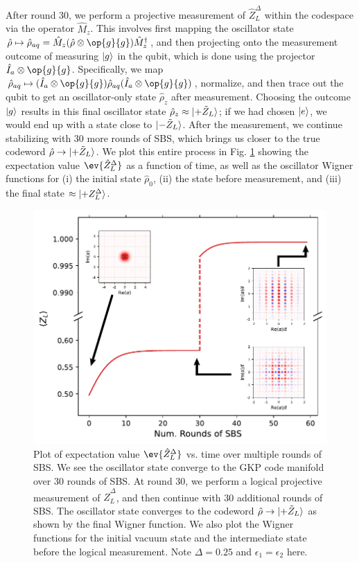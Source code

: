 After round 30, we perform a projective measurement of $\hat{Z}_L^\Delta$ within the codespace via the operator $\hat{M}_z$. This involves first mapping the oscillator state $\hat{\rho} \mapsto \hat{\rho}_{aq} = \hat{M}_z(\hat{\rho}\otimes \op{g}{g})\hat{M}_z^\dagger$, and then projecting onto the measurement outcome of measuring $\lvert g\rangle$ in the qubit, which is done using the projector $\hat{I}_a \otimes \op{g}{g}$. Specifically, we map $\hat{\rho}_{aq} \mapsto (\hat{I}_a \otimes \op{g}{g}) \hat{\rho}_{aq}(\hat{I}_a \otimes \op{g}{g})$, normalize, and then trace out the qubit to get an oscillator-only state $\hat{\rho}_z$ after measurement. Choosing the outcome $\lvert g\rangle$ results in this final oscillator state $\hat{\rho}_z \approx \lvert+\tilde{Z}_L\rangle$; if we had chosen $\lvert e\rangle$, we would end up with a state close to $\lvert-\tilde{Z}_L\rangle$. After the measurement, we continue stabilizing with 30 more rounds of SBS, which brings us closer to the true codeword $\hat{\rho} \to \lvert+\tilde{Z}_L\rangle$. We plot this entire process in Fig. \ref{fig:2_SBS_NoLoss_QEC_Sim} showing the expectation value $\ev{\hat{Z}_L^\Delta}$ as a function of time, as well as the oscillator Wigner functions for (i) the initial state $\hat{\rho}_0$, (ii) the state before measurement, and (iii) the final state $\approx \lvert+Z_L^\Delta\rangle$. 

\begin{figure}[h]
    \centering
    \includegraphics[width=0.85\linewidth]{Figures/2/SBS_NoLoss_QEC_Sim.pdf}
    \caption[Simulated SBS stabilization of the GKP $\ket{+\tilde{Z}_L}$ state for a lossless oscillator.]{Plot of expectation value $\ev{\hat{Z}_L^\Delta}$ vs. time over multiple rounds of SBS. We see the oscillator state converge to the GKP code manifold over 30 rounds of SBS. At round 30, we perform a logical projective measurement of $\hat{Z}_L^\Delta$, and then continue with 30 additional rounds of SBS. The oscillator state converges to the codeword $\hat{\rho} \to \lvert+\tilde{Z}_L\rangle$ as shown by the final Wigner function. We also plot the Wigner functions for the initial vacuum state and the intermediate state before the logical measurement. Note $\Delta = 0.25$ and $\epsilon_1 = \epsilon_2$ here.}
    \label{fig:2_SBS_NoLoss_QEC_Sim}
\end{figure}

